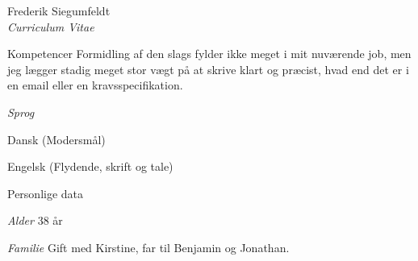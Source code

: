 \documentclass[a4paper]{article}
\begin{document}
\begin{cv}{Frederik Siegumfeldt\\{\large \itshape Curriculum Vitae}}
\begin{cvlist}{Kompetencer}
    Formidling af den slags fylder ikke meget i mit nuværende job, men
    jeg lægger stadig meget stor vægt på at skrive klart og præcist, hvad end
    det er i en email eller en kravsspecifikation.

  \item[\emph{Sprog}]

    Dansk (Modersmål)

    Engelsk (Flydende, skrift og tale)

\end{cvlist}

\begin{cvlist}{Personlige data}

  \item[\emph{Alder}]       38 år

  \item[\emph{Familie}]     Gift med Kirstine, far til Benjamin og Jonathan. 




\end{cvlist}
\end{cv}
\end{document}
